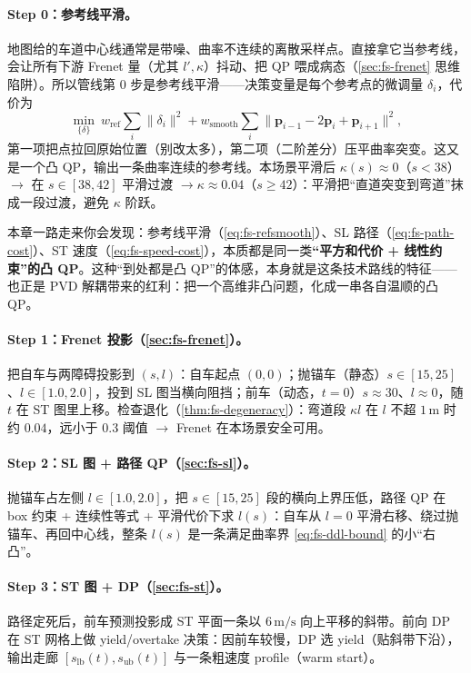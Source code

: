 \paragraph{Step 0：参考线平滑。}
地图给的车道中心线通常是带噪、曲率不连续的离散采样点。直接拿它当参考线，会让所有下游 Frenet 量（尤其 $l',\kappa$）抖动、把 QP 喂成病态（\cref{sec:fs-frenet} 思维陷阱）。所以管线第 0 步是参考线平滑——决策变量是每个参考点的微调量 $\delta_i$，代价为
\begin{equation}
  \min_{\{\delta\}}\ w_{\mathrm{ref}}\sum_i\|\delta_i\|^2+w_{\mathrm{smooth}}\sum_i\|\mathbf{p}_{i-1}-2\mathbf{p}_i+\mathbf{p}_{i+1}\|^2,
  \label{eq:fs-refsmooth}
\end{equation}
第一项把点拉回原始位置（别改太多），第二项（二阶差分）压平曲率突变。这又是一个凸 QP，输出一条曲率连续的参考线。本场景平滑后 $\kappa(s)\approx0$（$s<38$）$\to$ 在 $s\in[38,42]$ 平滑过渡 $\to\kappa\approx0.04$（$s\ge42$）：平滑把“直道突变到弯道”抹成一段过渡，避免 $\kappa$ 阶跃。

\begin{insight}
本章一路走来你会发现：参考线平滑（\cref{eq:fs-refsmooth}）、SL 路径（\cref{eq:fs-path-cost}）、ST 速度（\cref{eq:fs-speed-cost}），本质都是同一类\textbf{“平方和代价 + 线性约束”的凸 QP}。这种“到处都是凸 QP”的体感，本身就是这条技术路线的特征——也正是 PVD 解耦带来的红利：把一个高维非凸问题，化成一串各自温顺的凸 QP。
\end{insight}

\paragraph{Step 1：Frenet 投影（\cref{sec:fs-frenet}）。}
把自车与两障碍投影到 $(s,l)$：自车起点 $(0,0)$；抛锚车（静态）$s\in[15,25]$、$l\in[1.0,2.0]$，投到 SL 图当横向阻挡；前车（动态，$t{=}0$）$s\approx30$、$l\approx0$，随 $t$ 在 ST 图里上移。检查退化（\cref{thm:fs-degeneracy}）：弯道段 $\kappa l$ 在 $l$ 不超 $1\,\mathrm{m}$ 时约 $0.04$，远小于 $0.3$ 阈值 $\to$ Frenet 在本场景安全可用。

\paragraph{Step 2：SL 图 + 路径 QP（\cref{sec:fs-sl}）。}
抛锚车占左侧 $l\in[1.0,2.0]$，把 $s\in[15,25]$ 段的横向上界压低，路径 QP 在 box 约束 + 连续性等式 + 平滑代价下求 $l(s)$：自车从 $l=0$ 平滑右移、绕过抛锚车、再回中心线，整条 $l(s)$ 是一条满足曲率界 \cref{eq:fs-ddl-bound} 的小“右凸”。

\paragraph{Step 3：ST 图 + DP（\cref{sec:fs-st}）。}
路径定死后，前车预测投影成 ST 平面一条以 $6\,\mathrm{m/s}$ 向上平移的斜带。前向 DP 在 ST 网格上做 yield/overtake 决策：因前车较慢，DP 选 yield（贴斜带下沿），输出走廊 $[s_{\mathrm{lb}}(t),s_{\mathrm{ub}}(t)]$ 与一条粗速度 profile（warm start）。

